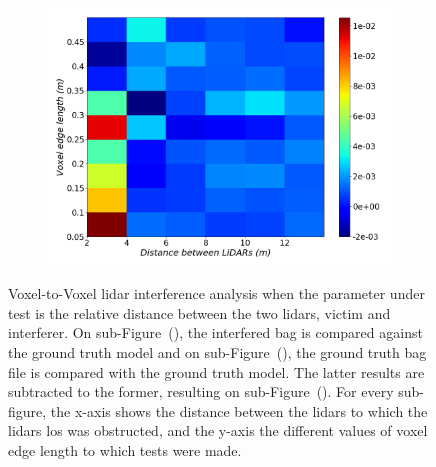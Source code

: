 \begin{figure}[!ht]
\begin{subfigure}[c]{0.45\textwidth}
	\label{fig:los:octree-ground-truth-color-mesh}
\end{subfigure}
\\ \vspace{4mm}
\begin{subfigure}[c]{0.6\textwidth}
	\includegraphics[width=\textwidth]{img/lidar-interference/LOS/octree_difference_color_mesh.png}
	\caption{}%
	\label{fig:los:octree-difference-color-mesh}
\end{subfigure}

\caption[Voxel-to-Voxel analysis when the \acp{lidar} \ac{los} is obstructed and the distance between \acp{lidar} is variated.]{Voxel-to-Voxel \ac{lidar} interference analysis when the parameter under test is the relative distance between the two \acp{lidar}, victim and interferer. On sub-Figure~(), the interfered bag is compared against the ground truth model and on sub-Figure~(), the ground truth bag file is compared with the ground truth model. The latter results are subtracted to the former, resulting on sub-Figure~(). For every sub-figure, the x-axis shows the distance between the \acp{lidar} to which the \acp{lidar} \ac{los} was obstructed, and the y-axis the different values of voxel edge length to which tests were made.}
\label{fig:los:octree-color-mesh}
\end{figure}

